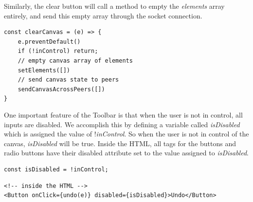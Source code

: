 Similarly, the clear button will call a method to empty the \textit{elements} array entirely, and send this empty array through the socket connection.

\begin{verbatim}
const clearCanvas = (e) => {
    e.preventDefault()
    if (!inControl) return;
    // empty canvas array of elements
    setElements([])
    // send canvas state to peers
    sendCanvasAcrossPeers([])
}
\end{verbatim}

One important feature of the Toolbar is that when the user is not in control, all inputs are disabled. We accomplish this by defining a variable called \textit{isDisabled} which is assigned the value of !\textit{inControl}. So when the user is not in control of the canvas, \textit{isDisabled} will be true. Inside the HTML, all tags for the buttons and radio buttons have their disabled attribute set to the value assigned to \textit{isDisabled}. 

\begin{verbatim}
const isDisabled = !inControl;
\end{verbatim}
\begin{verbatim}
<!-- inside the HTML --> 
<Button onClick={undo(e)} disabled={isDisabled}>Undo</Button>
\end{verbatim}

